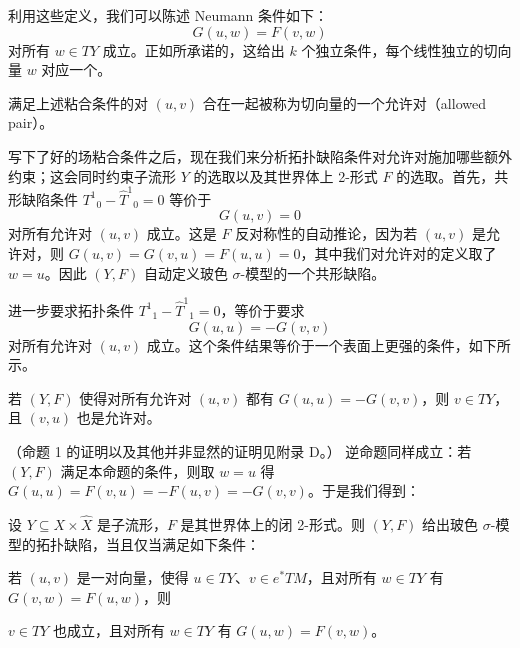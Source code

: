 利用这些定义，我们可以陈述 Neumann 条件如下：
\[
G(u,w)=F(v,w)
\]
对所有 $w\in TY$ 成立。正如所承诺的，这给出 $k$ 个独立条件，每个线性独立的切向量 $w$ 对应一个。

\begin{definition}[1]
满足上述粘合条件的对 $(u,v)$ 合在一起被称为切向量的一个允许对（allowed pair）。
\end{definition}

写下了好的场粘合条件之后，现在我们来分析拓扑缺陷条件对允许对施加哪些额外约束；这会同时约束子流形 $Y$ 的选取以及其世界体上 2-形式 $F$ 的选取。首先，共形缺陷条件 $T^1{}_0-\hat T^1{}_0=0$ 等价于
\[
G(u,v)=0
\]
对所有允许对 $(u,v)$ 成立。这是 $F$ 反对称性的自动推论，因为若 $(u,v)$ 是允许对，则 $G(u,v)=G(v,u)=F(u,u)=0$，其中我们对允许对的定义取了 $w=u$。因此 $(Y,F)$ 自动定义玻色 $\sigma$-模型的一个共形缺陷。

进一步要求拓扑条件 $T^1{}_1-\hat T^1{}_1=0$，等价于要求
\[
G(u,u)=-G(v,v)
\]
对所有允许对 $(u,v)$ 成立。这个条件结果等价于一个表面上更强的条件，如下所示。

\begin{proposition}[1]
若 $(Y,F)$ 使得对所有允许对 $(u,v)$ 都有 $G(u,u)=-G(v,v)$，则 $v\in TY$，且 $(v,u)$ 也是允许对。
\end{proposition}

（命题 1 的证明以及其他并非显然的证明见附录 D。）
逆命题同样成立：若 $(Y,F)$ 满足本命题的条件，则取 $w=u$ 得 $G(u,u)=F(v,u)=-F(u,v)=-G(v,v)$。于是我们得到：

\begin{proposition}[2]
设 $Y\subseteq X\times\hat X$ 是子流形，$F$ 是其世界体上的闭 2-形式。则 $(Y,F)$ 给出玻色 $\sigma$-模型的拓扑缺陷，当且仅当满足如下条件：

若 $(u,v)$ 是一对向量，使得 $u\in TY$、$v\in e^*TM$，且对所有 $w\in TY$ 有 $G(v,w)=F(u,w)$，则

$v\in TY$ 也成立，且对所有 $w\in TY$ 有 $G(u,w)=F(v,w)$。
\end{proposition}

